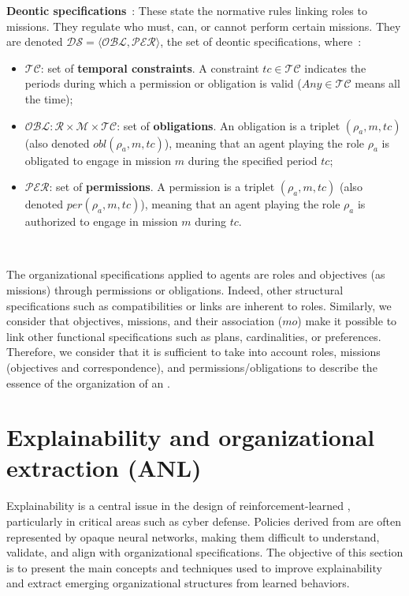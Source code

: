         \noindent \textbf{Deontic specifications}~: These state the normative rules linking roles to missions.
        They regulate who must, can, or cannot perform certain missions. They are denoted \quad $\mathcal{DS} = \langle \mathcal{OBL}, \mathcal{PER} \rangle$, the set of deontic specifications, where~:
        \begin{itemize}
          \item $\mathcal{TC}$: set of \textbf{temporal constraints}.
                A constraint $tc \in \mathcal{TC}$ indicates the periods during which a permission or obligation is valid ($Any \in \mathcal{TC}$ means all the time);
          \item $\mathcal{OBL}: \mathcal{R} \times \mathcal{M} \times \mathcal{TC}$: set of \textbf{obligations}. An obligation is a triplet $(\rho_a, m, tc)$ (also denoted $obl(\rho_a, m, tc)$), meaning that an agent playing the role $\rho_a$ is obligated to engage in mission $m$ during the specified period $tc$;
          \item $\mathcal{PER}$: set of \textbf{permissions}. A permission is a triplet $(\rho_a, m, tc)$ (also denoted $per(\rho_a, m, tc)$), meaning that an agent playing the role $\rho_a$ is authorized to engage in mission $m$ during $tc$.
        \end{itemize}

        \

        \noindent The organizational specifications applied to agents are roles and objectives (as missions) through permissions or obligations. Indeed, other structural specifications such as compatibilities or links are inherent to roles. Similarly, we consider that objectives, missions, and their association ($mo$) make it possible to link other functional specifications such as plans, cardinalities, or preferences.
        Therefore, we consider that it is sufficient to take into account roles, missions (objectives and correspondence), and permissions/obligations to describe the essence of the organization of an .


        \section{Explainability and organizational extraction (ANL)}

        \noindent
        Explainability is a central issue in the design of reinforcement-learned ,
        particularly in critical areas such as cyber defense.
        Policies derived from  are often represented by opaque neural networks,
        making them difficult to understand, validate, and align
        with organizational specifications.
        The objective of this section is to present the main concepts and techniques
        used to improve explainability and extract emerging organizational structures
        from learned behaviors.

